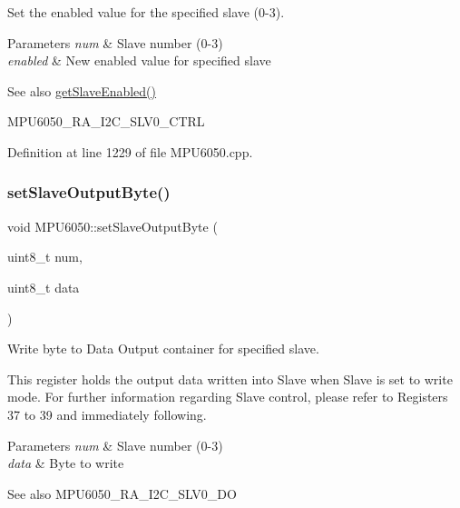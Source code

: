 Set the enabled value for the specified slave (0-\/3). 


\begin{DoxyParams}{Parameters}
{\em num} & Slave number (0-\/3) \\
\hline
{\em enabled} & New enabled value for specified slave \\
\hline
\end{DoxyParams}
\begin{DoxySeeAlso}{See also}
\mbox{\hyperlink{classMPU6050_a5f14bde83fe00b27dec6776fc44e89c2}{get\+Slave\+Enabled()}} 

M\+P\+U6050\+\_\+\+R\+A\+\_\+\+I2\+C\+\_\+\+S\+L\+V0\+\_\+\+C\+T\+RL 
\end{DoxySeeAlso}


Definition at line 1229 of file M\+P\+U6050.\+cpp.

\mbox{\label{classMPU6050_a34a1def575f6abcd464afe954de8a461}} 
\subsubsection{\texorpdfstring{setSlaveOutputByte()}{setSlaveOutputByte()}}
{\footnotesize\ttfamily void M\+P\+U6050\+::set\+Slave\+Output\+Byte (\begin{DoxyParamCaption}\item[{uint8\+\_\+t}]{num,  }\item[{uint8\+\_\+t}]{data }\end{DoxyParamCaption})}



Write byte to Data Output container for specified slave. 

This register holds the output data written into Slave when Slave is set to write mode. For further information regarding Slave control, please refer to Registers 37 to 39 and immediately following. 
\begin{DoxyParams}{Parameters}
{\em num} & Slave number (0-\/3) \\
\hline
{\em data} & Byte to write \\
\hline
\end{DoxyParams}
\begin{DoxySeeAlso}{See also}
M\+P\+U6050\+\_\+\+R\+A\+\_\+\+I2\+C\+\_\+\+S\+L\+V0\+\_\+\+DO 
\end{DoxySeeAlso}


